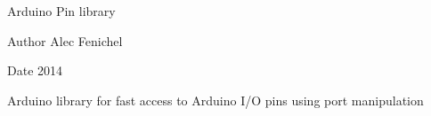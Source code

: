 Arduino Pin library \begin{DoxyAuthor}{Author}
Alec Fenichel 
\end{DoxyAuthor}
\begin{DoxyDate}{Date}
2014
\end{DoxyDate}
Arduino library for fast access to Arduino I/\+O pins using port manipulation 